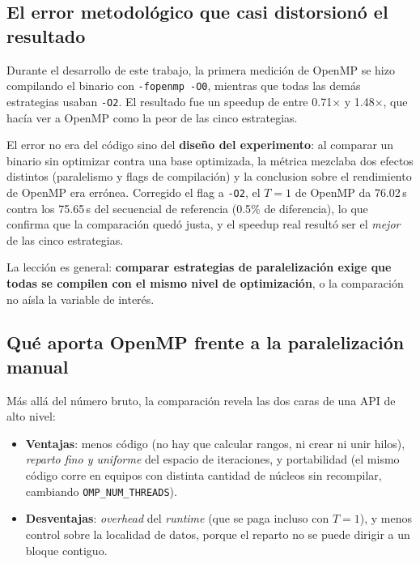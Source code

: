\subsection{El error metodológico que casi distorsionó el resultado}

Durante el desarrollo de este trabajo, la primera medición de OpenMP se hizo compilando el binario con \texttt{-fopenmp -O0}, mientras que todas las demás estrategias usaban \texttt{-O2}. El resultado fue un speedup de entre 0.71$\times$ y 1.48$\times$, que hacía ver a OpenMP como la peor de las cinco estrategias.

El error no era del código sino del \textbf{diseño del experimento}: al comparar un binario sin optimizar contra una base optimizada, la métrica mezclaba dos efectos distintos (paralelismo y flags de compilación) y la conclusion sobre el rendimiento de OpenMP era errónea. Corregido el flag a \texttt{-O2}, el $T=1$ de OpenMP da 76.02\,s contra los 75.65\,s del secuencial de referencia (0.5\% de diferencia), lo que confirma que la comparación quedó justa, y el speedup real resultó ser el \emph{mejor} de las cinco estrategias.

La lección es general: \textbf{comparar estrategias de paralelización exige que todas se compilen con el mismo nivel de optimización}, o la comparación no aísla la variable de interés.

\subsection{Qué aporta OpenMP frente a la paralelización manual}

Más allá del número bruto, la comparación revela las dos caras de una API de alto nivel:

\begin{itemize}
    \item \textbf{Ventajas}: menos código (no hay que calcular rangos, ni crear ni unir hilos), \emph{reparto fino y uniforme} del espacio de iteraciones, y portabilidad (el mismo código corre en equipos con distinta cantidad de núcleos sin recompilar, cambiando \texttt{OMP\_NUM\_THREADS}).
    \item \textbf{Desventajas}: \emph{overhead} del \textit{runtime} (que se paga incluso con $T=1$), y menos control sobre la localidad de datos, porque el reparto no se puede dirigir a un bloque contiguo.
\end{itemize}

